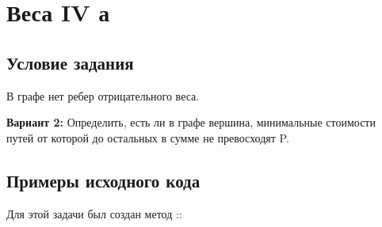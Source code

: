 \section{Веса IV а}
\subsection{Условие задания}
В графе нет ребер отрицательного веса.

\textbf{Вариант 2:} Определить, есть ли в графе вершина, минимальные стоимости путей от
которой до остальных в сумме не превосходят P.

\subsection{Примеры исходного кода}
Для этой задачи был создан метод ::
